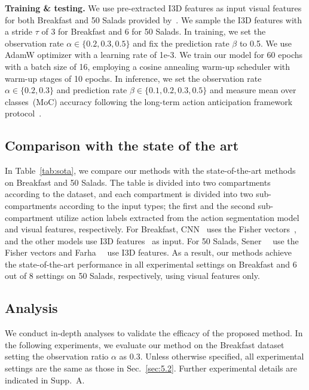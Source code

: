 \noindent
\textbf{Training \& testing.}
We use pre-extracted I3D features\cite{carreira2017quo} as input visual features for both Breakfast and 50 Salads provided by~\cite{farha2019ms}.
We sample the I3D features with a stride $\tau$ of 3 for Breakfast and 6 for 50 Salads.
In training, we set the observation rate $\alpha \in \{0.2, 0.3, 0.5\}$ and fix the prediction rate $\beta$ to 0.5. 
We use AdamW optimizer\cite{loshchilov2017decoupled} with a learning rate of 1e-3.
We train our model for 60 epochs with a batch size of 16, employing a cosine annealing warm-up scheduler\cite{loshchilov2016sgdr} with warm-up stages of 10 epochs.
In inference, we set the observation rate $\alpha \in \{0.2, 0.3\}$ and prediction rate $\beta \in \{0.1, 0.2, 0.3, 0.5\}$ and measure mean over classes~(MoC) accuracy following the long-term action anticipation framework protocol~\cite{abu2018will,ke2019time,sener2020temporal,farha2020long}.

\subsection{Comparison with the state of the art}
\label{sec:5.3}
In Table~\ref{tab:sota}, we compare our methods with the state-of-the-art methods on Breakfast and 50 Salads.
The table is divided into two compartments according to the dataset, and each compartment is divided into two sub-compartments according to the input types;
the first and the second sub-compartment utilize action labels extracted from the action segmentation model~\cite{richard2017weakly} and visual features, respectively.
For Breakfast, CNN~\cite{abu2018will} uses the Fisher vectors~\cite{abu2018will}, and the other models use I3D features~\cite{carreira2017quo} as input.
For 50 Salads, Sener~\etal~\cite{sener2020temporal} use the Fisher vectors and Farha~\etal~\cite{farha2020long} use I3D features.
As a result, our methods achieve the state-of-the-art performance in all experimental settings on Breakfast and 6 out of 8 settings on 50 Salads, respectively, using visual features only.

\subsection{Analysis}
\label{sec:5.4}
We conduct in-depth analyses to validate the efficacy of the proposed method. In the following experiments, we evaluate our method on the Breakfast dataset setting the observation ratio $\alpha$ as 0.3.
Unless otherwise specified, all experimental settings are the same as those in Sec.~\ref{sec:5.2}.
Further experimental details are indicated in Supp.~A.

